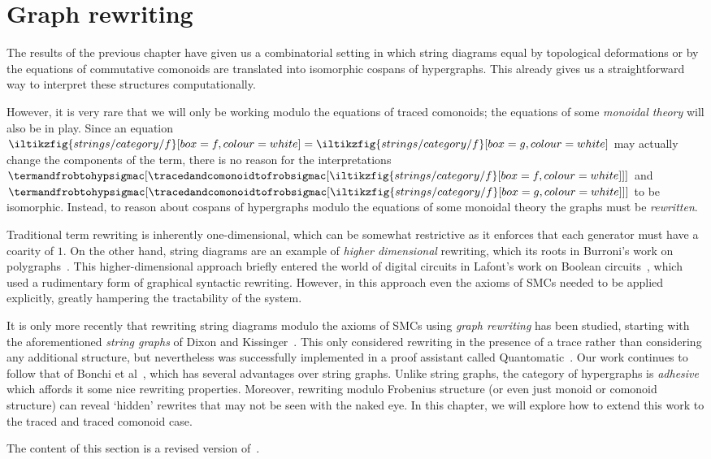 \chapter{Graph rewriting}\label{chap:rewriting}

The results of the previous chapter have given us a combinatorial setting in
which string diagrams equal by topological deformations or by the equations of
commutative comonoids are translated into isomorphic cospans of hypergraphs.
This already gives us a straightforward way to interpret these structures
computationally.

However, it is very rare that we will only be working modulo the equations of
traced comonoids; the equations of some \emph{monoidal theory} will also be in
play.
Since an equation \(
\iltikzfig{strings/category/f}[box=f,colour=white]
=
\iltikzfig{strings/category/f}[box=g,colour=white]
\) may actually change the components of the term, there is no reason for the
interpretations \(
\termandfrobtohypsigmac[
    \tracedandcomonoidtofrobsigmac[
        \iltikzfig{strings/category/f}[box=f,colour=white]
    ]
]
\) and \(
\termandfrobtohypsigmac[
    \tracedandcomonoidtofrobsigmac[
        \iltikzfig{strings/category/f}[box=g,colour=white]
    ]
]
\) to be isomorphic.
Instead, to reason about cospans of hypergraphs modulo the equations of some
monoidal theory the graphs must be \emph{rewritten}.

Traditional term rewriting is inherently one-dimensional, which can be somewhat
restrictive as it enforces that each generator must have a coarity of \(1\).
On the other hand, string diagrams are an example of \emph{higher dimensional}
rewriting, which its roots in Burroni's work on
polygraphs~\cite{burroni1993higherdimensional}.
This higher-dimensional approach briefly entered the world of digital
circuits in Lafont's work on Boolean circuits~\cite{lafont2003algebraic}, which
used a rudimentary form of graphical syntactic rewriting.
However, in this approach even the axioms of SMCs needed to be applied
explicitly, greatly hampering the tractability of the system.

It is only more recently that rewriting string diagrams modulo the axioms of
SMCs using \emph{graph rewriting} has been studied, starting with the
aforementioned \emph{string graphs} of Dixon and
Kissinger~\cite{dixon2010open,kissinger2012pictures,dixon2013opengraphs}.
This only considered rewriting in the presence of a trace rather than
considering any additional structure, but nevertheless was successfully
implemented in a proof assistant called
Quantomatic~\cite{kissinger2015quantomatic}.
Our work continues to follow that of Bonchi et
al~\cite{bonchi2022string,bonchi2022stringa}, which has several advantages
over string graphs.
Unlike string graphs, the category of hypergraphs is
\emph{adhesive}~\cite{lack2004adhesive} which affords it some nice rewriting
properties.
Moreover, rewriting modulo Frobenius structure (or even just monoid or comonoid
structure) can reveal `hidden' rewrites that may not be seen with the naked eye.
In this chapter, we will explore how to extend this work to the traced and
traced comonoid case.

\begin{remark}
    The content of this section is a revised version
    of~\cite[Sec. 5]{ghica2023rewriting}.
\end{remark}




